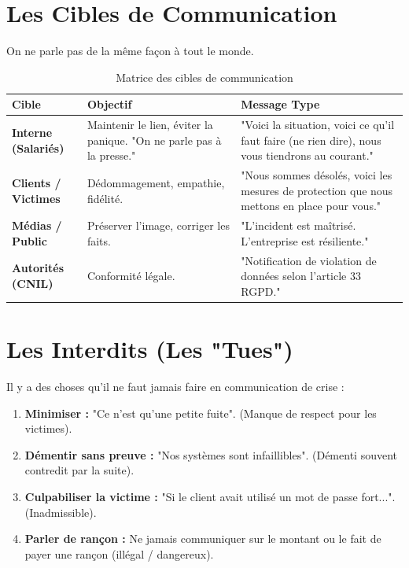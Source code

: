 \section{Les Cibles de Communication}

On ne parle pas de la même façon à tout le monde.

\begin{table}[htbp]
\centering
\begin{tabular}{p{3cm}p{4cm}p{5cm}}
    \toprule
    \textbf{Cible} & \textbf{Objectif} & \textbf{Message Type} \\
    \midrule
    \textbf{Interne (Salariés)} & Maintenir le lien, éviter la panique. "On ne parle pas à la presse." & "Voici la situation, voici ce qu'il faut faire (ne rien dire), nous vous tiendrons au courant." \\
    \textbf{Clients / Victimes} & Dédommagement, empathie, fidélité. & "Nous sommes désolés, voici les mesures de protection que nous mettons en place pour vous." \\
    \textbf{Médias / Public} & Préserver l'image, corriger les faits. & "L'incident est maîtrisé. L'entreprise est résiliente." \\
    \textbf{Autorités (CNIL)} & Conformité légale. & "Notification de violation de données selon l'article 33 RGPD." \\
    \bottomrule
\end{tabular}
\caption{Matrice des cibles de communication}
\end{table}

\section{Les Interdits (Les "Tues")}

Il y a des choses qu'il ne faut jamais faire en communication de crise :

\begin{enumerate}
    \item \textbf{Minimiser :} "Ce n'est qu'une petite fuite". (Manque de respect pour les victimes).
    \item \textbf{Démentir sans preuve :} "Nos systèmes sont infaillibles". (Démenti souvent contredit par la suite).
    \item \textbf{Culpabiliser la victime :} "Si le client avait utilisé un mot de passe fort...". (Inadmissible).
    \item \textbf{Parler de rançon :} Ne jamais communiquer sur le montant ou le fait de payer une rançon (illégal / dangereux).
\end{enumerate}


